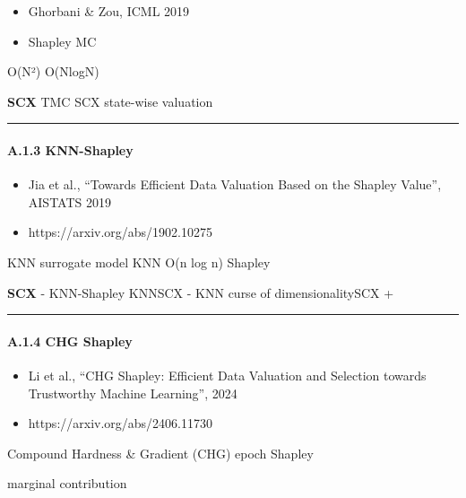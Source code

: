 \documentclass[
  12pt,
]{article}
\providecommand{\tightlist}{%
  \setlength{\itemsep}{0pt}\setlength{\parskip}{0pt}}
\begin{document}
\begin{itemize}
\tightlist
\item
  \textbf{}Ghorbani \& Zou, ICML 2019
\item
  \textbf{} Shapley  MC
  
\end{itemize}

\textbf{} O(N²)  O(NlogN)

\textbf{SCX }TMC SCX
 state-wise valuation 

\begin{center}\rule{0.5\linewidth}{0.5pt}\end{center}

\paragraph{A.1.3 KNN-Shapley}\label{a.1.3-knn-shapley}

\begin{itemize}
\tightlist
\item
  \textbf{}Jia et al., ``Towards Efficient Data Valuation Based on
  the Shapley Value'', AISTATS 2019
\item
  \textbf{}https://arxiv.org/abs/1902.10275
\end{itemize}

\textbf{} KNN surrogate model KNN
 O(n log n)  Shapley 

\textbf{}

\textbf{SCX } - KNN-Shapley
KNNSCX
 - KNN
curse of dimensionalitySCX
 + 

\begin{center}\rule{0.5\linewidth}{0.5pt}\end{center}

\paragraph{A.1.4 CHG Shapley}\label{a.1.4-chg-shapley}

\begin{itemize}
\tightlist
\item
  \textbf{}Li et al., ``CHG Shapley: Efficient Data Valuation and
  Selection towards Trustworthy Machine Learning'', 2024
\item
  \textbf{}https://arxiv.org/abs/2406.11730
\end{itemize}

\textbf{} Compound Hardness \& Gradient (CHG)
 epoch Shapley 

\textbf{} marginal contribution
\end{document}
